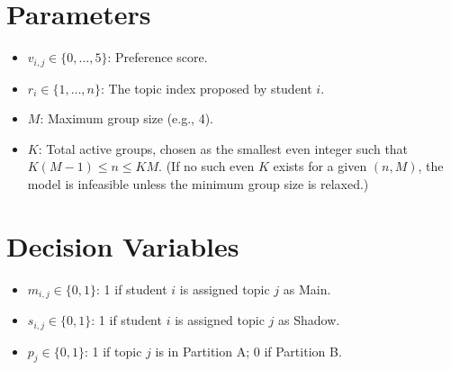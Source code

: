 \documentclass[12pt]{article}
\begin{document}
	\section{Parameters}
	\begin{itemize}
		\item $v_{i,j} \in \{0, \ldots, 5\}$: Preference score.
		\item $r_i \in \{1, \dots, n\}$: The topic index proposed by student $i$.
		\item $M$: Maximum group size (e.g., 4).
		\item $K$: Total active groups, chosen as the smallest even integer such that $K(M-1) \le n \le KM$. (If no such even $K$ exists for a given $(n,M)$, the model is infeasible unless the minimum group size is relaxed.)
	\end{itemize}
	
	\section{Decision Variables}
	\begin{itemize}
		\item $m_{i,j} \in \{0, 1\}$: 1 if student $i$ is assigned topic $j$ as Main.
		\item $s_{i,j} \in \{0, 1\}$: 1 if student $i$ is assigned topic $j$ as Shadow.
		\item $p_j \in \{0, 1\}$: 1 if topic $j$ is in Partition A; 0 if Partition B.
	\end{itemize}
	
\end{document}
